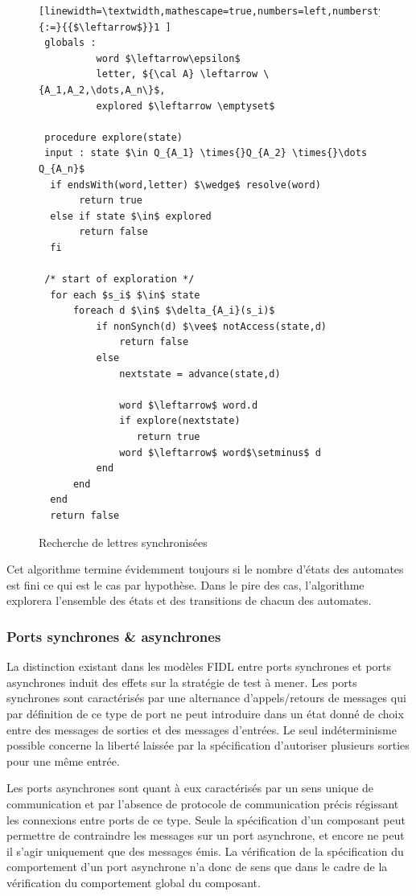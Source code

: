 \begin{figure}
    \centering
    \begin{lstlisting}[linewidth=\textwidth,mathescape=true,numbers=left,numberstyle=\tiny,literate={:=}{{$\leftarrow$}}1 ]
 globals : 
          word $\leftarrow\epsilon$ 
          letter, ${\cal A} \leftarrow \{A_1,A_2,\dots,A_n\}$, 
          explored $\leftarrow \emptyset$ 

 procedure explore(state)
 input : state $\in Q_{A_1} \times{}Q_{A_2} \times{}\dots Q_{A_n}$  
  if endsWith(word,letter) $\wedge$ resolve(word)
       return true 
  else if state $\in$ explored 
       return false 
  fi 
 
 /* start of exploration */ 
  for each $s_i$ $\in$ state 
      foreach d $\in$ $\delta_{A_i}(s_i)$ 
          if nonSynch(d) $\vee$ notAccess(state,d)
              return false
          else 
              nextstate = advance(state,d)

              word $\leftarrow$ word.d 
              if explore(nextstate) 
                 return true 
              word $\leftarrow$ word$\setminus$ d 
          end
      end 
  end 
  return false 
 \end{lstlisting}
 \caption{Recherche de lettres synchronis\'ees}
 \label{fig-algo-sync}
 \end{figure}

Cet algorithme termine \'evidemment toujours si le nombre d'\'etats
des automates est fini ce qui est le cas par hypoth\`ese. Dans le
pire des cas, l'algorithme explorera l'ensemble des \'etats et des
transitions de chacun des automates. 
 
\subsubsection{Ports synchrones \& asynchrones}

La distinction existant dans les mod\`eles \textsf{FIDL} entre ports
synchrones et ports asynchrones induit des effets sur la strat\'egie
de test \`a mener. Les ports synchrones sont caract\'eris\'es par
une alternance d'appels/retours de messages qui par d\'efinition de
ce type de port ne  peut introduire dans un \'etat donn\'e de choix
entre des messages de sorties et des messages d'entr\'ees. Le seul
ind\'eterminisme possible concerne la libert\'e laiss\'ee par la
sp\'ecification d'autoriser plusieurs sorties pour une m\^eme
entr\'ee. 

Les ports asynchrones sont quant \`a eux caract\'eris\'es par un
sens unique de communication et par l'absence de protocole de
communication pr\'ecis r\'egissant les connexions entre ports de ce
type. Seule la sp\'ecification d'un composant peut permettre de
contraindre les messages sur un port asynchrone, et encore ne peut il
s'agir uniquement que des messages \'emis. La v\'erification de la
sp\'ecification du comportement d'un port asynchrone n'a 
donc de sens que dans le cadre de la v\'erification du comportement
global du composant.

